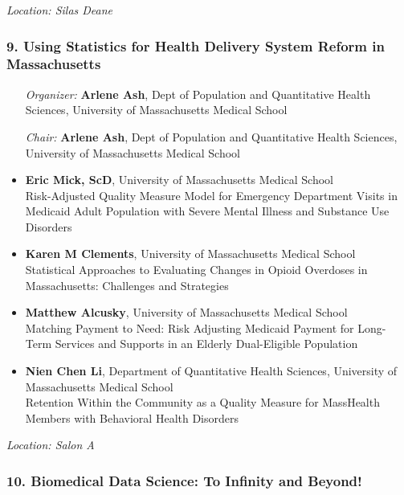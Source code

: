 \emph{Location: Silas Deane}

\subsubsection*{9. Using Statistics for Health Delivery System Reform in Massachusetts}

\begin{enumerate}[align=left]
\item [\emph{Organizer:}] \textbf{Arlene Ash}, Dept of Population and Quantitative Health Sciences, University of Massachusetts Medical School
\item [\emph{Chair:}] \textbf{Arlene Ash}, Dept of Population and Quantitative Health Sciences, University of Massachusetts Medical School
\end{enumerate}

\begin{itemize}
\item \textbf{Eric Mick, ScD}, University of Massachusetts Medical School \\
Risk-Adjusted Quality Measure Model for Emergency Department Visits in Medicaid Adult Population with Severe Mental Illness and Substance Use Disorders
\item \textbf{Karen M Clements}, University of Massachusetts Medical School \\
Statistical Approaches to Evaluating Changes in Opioid Overdoses in Massachusetts: Challenges and Strategies
\item \textbf{Matthew Alcusky}, University of Massachusetts Medical School \\
Matching Payment to Need: Risk Adjusting Medicaid Payment for Long-Term Services and Supports in an Elderly Dual-Eligible Population
\item \textbf{Nien Chen Li}, Department of Quantitative Health Sciences, University of Massachusetts Medical School \\
Retention Within the Community as a Quality Measure for MassHealth Members with Behavioral Health Disorders
\end{itemize}

\emph{Location: Salon A}

\subsubsection*{10. Biomedical Data Science: To Infinity and Beyond!}

